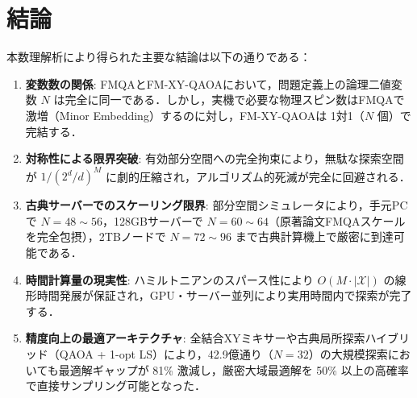 \documentclass[11pt,a4paper]{ltjsarticle}
\begin{document}
\enlargethispage{2\baselineskip}
\vspace{-2.5mm}
\section{結論}
\label{sec:conclusion}
\vspace{-1.5mm}
本数理解析により得られた主要な結論は以下の通りである：
\begin{enumerate}\setlength{\itemsep}{0pt}\small
    \item \textbf{変数数の関係}: FMQAとFM-XY-QAOAにおいて，問題定義上の論理二値変数 $N$ は完全に同一である．しかし，実機で必要な物理スピン数はFMQAで激増（Minor Embedding）するのに対し，FM-XY-QAOAは 1対1（$N$ 個）で完結する．
    \item \textbf{対称性による限界突破}: 有効部分空間への完全拘束により，無駄な探索空間が $1 / (2^d/d)^M$ に劇的圧縮され，アルゴリズム的死滅が完全に回避される．
    \item \textbf{古典サーバーでのスケーリング限界}: 部分空間シミュレータにより，手元PCで $N=48 \sim 56$，128GBサーバーで $N=60 \sim 64$（原著論文FMQAスケールを完全包摂），2TBノードで $N=72 \sim 96$ まで古典計算機上で厳密に到達可能である．
    \item \textbf{時間計算量の現実性}: ハミルトニアンのスパース性により $O(M \cdot |\mathcal{X}|)$ の線形時間発展が保証され，GPU・サーバー並列により実用時間内で探索が完了する．
    \item \textbf{精度向上の最適アーキテクチャ}: 全結合XYミキサーや古典局所探索ハイブリッド（QAOA + 1-opt LS）により，42.9億通り（$N=32$）の大規模探索においても最適解ギャップが 81\% 激減し，厳密大域最適解を 50\% 以上の高確率で直接サンプリング可能となった．
\end{enumerate}
\end{document}
